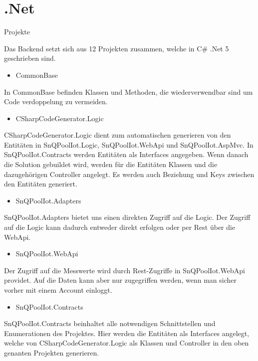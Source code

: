 \section{.Net}

Projekte



Das Backend setzt sich aus 12 Projekten zusammen, welche in C\# .Net 5 geschrieben sind.

\begin{itemize}
    \item CommonBase
\end{itemize}

In CommonBase befinden Klassen und Methoden, die wiederverwendbar sind um Code verdoppelung zu vermeiden.

\begin{itemize}
    \item CSharpCodeGenerator.Logic
\end{itemize}

CSharpCodeGenerator.Logic dient zum automatischen generieren von den Entitäten 
in SnQPoolIot.Logic, SnQPoolIot.WebApi und SnQPoolIot.AspMvc.
In SnQPoolIot.Contracts werden Entitäten als Interfaces angegeben.
Wenn danach die Solution gebuildet wird, werden für die Entitäten Klassen und die dazugehörigen Controller angelegt.
Es werden auch Beziehung und Keys zwischen den Entitäten generiert.


\begin{itemize}
    \item SnQPoolIot.Adapters
\end{itemize}

SnQPoolIot.Adapters bietet uns einen direkten Zugriff auf die Logic.
Der Zugriff auf die Logic kann dadurch entweder direkt erfolgen oder per Rest über die WebApi.

\begin{itemize}
    \item SnQPoolIot.WebApi
\end{itemize}

Der Zugriff auf die Messwerte wird durch Rest-Zugriffe in SnQPoolIot.WebApi providet.
Auf die Daten kann aber nur zugegriffen werden, wenn man sicher vorher mit einem Account einloggt.  

\begin{itemize}
    \item SnQPoolIot.Contracts
\end{itemize}

SnQPoolIot.Contracts beinhaltet alle notwendigen Schnittstellen und Enumerationen des Projektes.
Hier werden die Entitäten als Interfaces angelegt, 
welche von CSharpCodeGenerator.Logic als Klassen und Controller in den oben genanten Projekten generieren.

